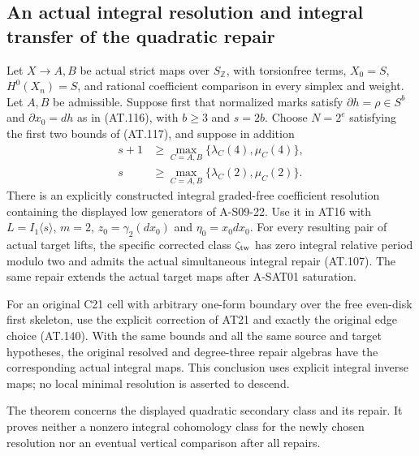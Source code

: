 \subsection{An actual integral resolution and integral transfer of the quadratic repair}

\begin{theorem}
\label{AT22}
Let $X\to A,B$ be actual strict maps over $S_{\mathbb Z}$,
with torsionfree terms, $X_0=S$, $H^0(X_n)=S$, and rational
coefficient comparison in every simplex and weight.
Let $A,B$ be admissible.
Suppose first that normalized marks satisfy
$\partial h=\rho\in S^b$ and $\partial x_0=dh$ as in
(AT.116), with $b\geq3$ and $s=2b$.
Choose $N=2^e$ satisfying the first two bounds of (AT.117),
and suppose in addition
\[
 \begin{split}
 s+1&\geq
  \max_{C=A,B}\{\lambda_C(4),\mu_C(4)\},\\
 s&\geq
  \max_{C=A,B}\{\lambda_C(2),\mu_C(2)\}.
 \end{split}                                                     \tag{AT.150}
\]
There is an explicitly constructed integral graded-free
coefficient resolution containing the displayed low generators
of A-S09-22. Use it in AT16 with
$L=I_1\langle s\rangle$, $m=2$,
$z_0=\gamma_2(dx_0)$ and $\eta_0=x_0dx_0$.
For every resulting pair of actual target lifts, the specific
corrected class $\zeta_{\rm tw}$ has zero integral relative
period modulo two and admits the actual simultaneous
integral repair (AT.107).
The same repair extends the actual target maps after
A-SAT01 saturation.

For an original C21 cell with arbitrary one-form boundary
over the free even-disk first skeleton, use the explicit
correction of AT21 and exactly the original edge choice
(AT.140). With the same bounds and all the same source
and target hypotheses, the original resolved and degree-three
repair algebras have the corresponding actual integral
maps. This conclusion uses explicit integral inverse maps;
no local minimal resolution is asserted to descend.

The theorem concerns the displayed quadratic secondary
class and its repair. It proves neither a nonzero integral
cohomology class for the newly chosen resolution nor an
eventual vertical comparison after all repairs.
\end{theorem}

